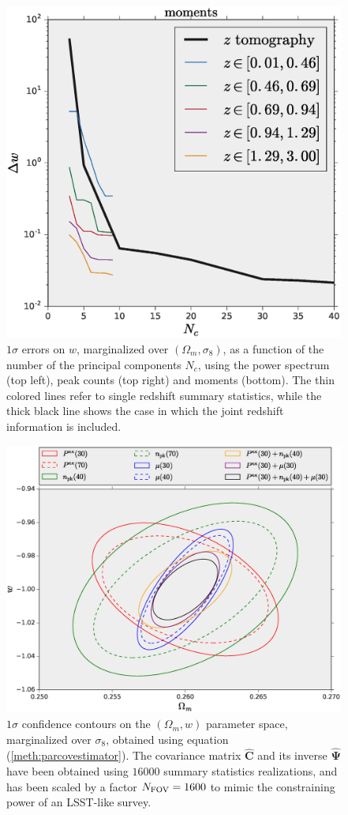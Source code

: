 \documentclass[reprint,aps,prd,superscriptaddress,showkeys,showpacs]{revtex4-1}
\newcommand{\bbh}[1]{\mathbf{\hat{#1}}}
\begin{document}
\begin{figure}
\includegraphics[scale=0.3]{Figures/w_moments_pca.eps}
\caption{$1\sigma$ errors on $w$, marginalized over $(\Omega_m,\sigma_8)$, as a function of the number of the principal components $N_c$, using the power spectrum (top left), peak counts (top right) and moments (bottom). The thin colored lines refer to single redshift summary statistics, while the thick black line shows the case in which the joint redshift information is included.}
\label{fig:pcacomponents}
\end{figure}


\begin{figure}
\includegraphics[scale=0.3]{Figures/constraints.eps}
\caption{$1\sigma$ confidence contours on the $(\Omega_m,w)$ parameter space, marginalized over $\sigma_8$, obtained using equation (\ref{meth:parcovestimator}). The covariance matrix $\bbh{C}$ and its inverse $\bbh{\Psi}$ have been obtained using $16000$ summary statistics realizations, and has been scaled by a factor $N_{\rm FOV}=1600$ to mimic the constraining power of an LSST-like survey.}
\label{fig:constraintsOm-w}
\end{figure}
\end{document}
